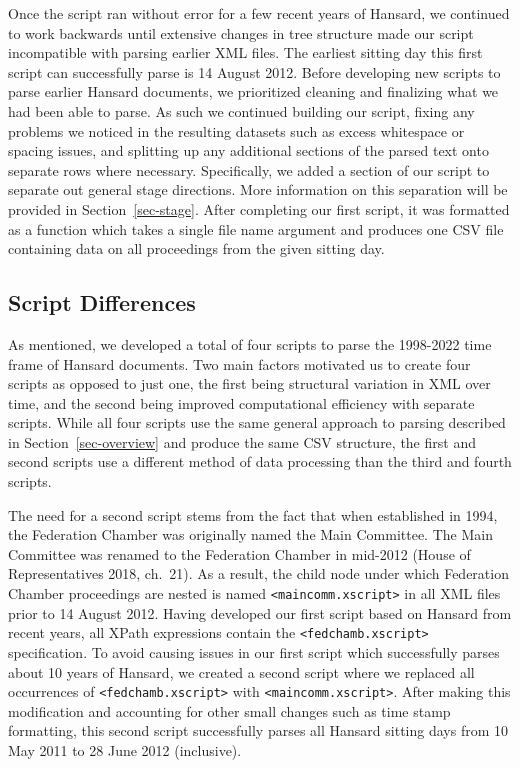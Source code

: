 \documentclass[
  letterpaper,
  DIV=11,
  numbers=noendperiod]{scrartcl}
\begin{document}
Once the script ran without error for a few recent years of Hansard, we
continued to work backwards until extensive changes in tree structure
made our script incompatible with parsing earlier XML files. The
earliest sitting day this first script can successfully parse is 14
August 2012. Before developing new scripts to parse earlier Hansard
documents, we prioritized cleaning and finalizing what we had been able
to parse. As such we continued building our script, fixing any problems
we noticed in the resulting datasets such as excess whitespace or
spacing issues, and splitting up any additional sections of the parsed
text onto separate rows where necessary. Specifically, we added a
section of our script to separate out general stage directions. More
information on this separation will be provided in
Section~\ref{sec-stage}. After completing our first script, it was
formatted as a function which takes a single file name argument and
produces one CSV file containing data on all proceedings from the given
sitting day.

\hypertarget{sec-diff}{%
\subsection{Script Differences}\label{sec-diff}}

As mentioned, we developed a total of four scripts to parse the
1998-2022 time frame of Hansard documents. Two main factors motivated us
to create four scripts as opposed to just one, the first being
structural variation in XML over time, and the second being improved
computational efficiency with separate scripts. While all four scripts
use the same general approach to parsing described in
Section~\ref{sec-overview} and produce the same CSV structure, the first
and second scripts use a different method of data processing than the
third and fourth scripts.

The need for a second script stems from the fact that when established
in 1994, the Federation Chamber was originally named the Main Committee.
The Main Committee was renamed to the Federation Chamber in mid-2012
(House of Representatives 2018, ch.~21). As a result, the child node
under which Federation Chamber proceedings are nested is named
\texttt{\textless{}maincomm.xscript\textgreater{}} in all XML files
prior to 14 August 2012. Having developed our first script based on
Hansard from recent years, all XPath expressions contain the
\texttt{\textless{}fedchamb.xscript\textgreater{}} specification. To
avoid causing issues in our first script which successfully parses about
10 years of Hansard, we created a second script where we replaced all
occurrences of \texttt{\textless{}fedchamb.xscript\textgreater{}} with
\texttt{\textless{}maincomm.xscript\textgreater{}}. After making this
modification and accounting for other small changes such as time stamp
formatting, this second script successfully parses all Hansard sitting
days from 10 May 2011 to 28 June 2012 (inclusive).
\end{document}
